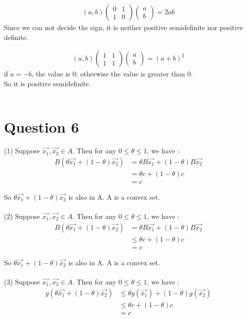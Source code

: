 \documentclass{amsart}
\begin{document}
\begin{align}
		(a,b)\left(
		\begin{matrix}
			0 & 1\\
			1 & 0
		\end{matrix}
		\right)
		\left(
		\begin{matrix}
			a\\
			b
		\end{matrix}
		\right)= 2ab
\end{align}
Since we can not decide the sign, it is neither positive semidefinite nor positive definite.
	
\begin{align}
	(a,b)\left(
	\begin{matrix}
		1 & 1\\
		1 & 1
	\end{matrix}
	\right)
	\left(
	\begin{matrix}
		a\\
		b
	\end{matrix}
	\right)= (a+b)^2
\end{align}	
if $a=-b$, the value is 0; otherwise the value is greater than 0.\\
So it is positive semidefinite.
\\
\\
\section{Question 6}
\noindent(1)
Suppose $\vec{x_1}, \vec{x_2} \in A$. Then for any $0\le \theta \le 1$, we have :
\begin{align*}
	B(\theta\vec{x_1} + (1-\theta)\vec{x_2}) &= \theta B \vec{x_1} + (1-\theta)B\vec{x_2}\\
	&= \theta c + (1-\theta) c\\
	&= c
\end{align*}

So $\theta\vec{x_1} + (1-\theta)\vec{x_2}$ is also in A. 
A is a convex set.
\\\\
\noindent(2)
Suppose $\vec{x_1}, \vec{x_2} \in A$. Then for any $0\le \theta \le 1$, we have :
\begin{align*}
	B(\theta\vec{x_1} + (1-\theta)\vec{x_2}) &= \theta B \vec{x_1} + (1-\theta)B\vec{x_2}\\
	&\le \theta c + (1-\theta) c\\
	&= c
\end{align*}

So $\theta\vec{x_1} + (1-\theta)\vec{x_2}$ is also in A. 
A is a convex set.
\\\\
\noindent(3)
Suppose $\vec{x_1}, \vec{x_2} \in A$. Then for any $0\le \theta \le 1$, we have :
\begin{align*}
	g(\theta\vec{x_1} + (1-\theta)\vec{x_2}) &\le \theta g(\vec{x_1}) + (1-\theta)g(\vec{x_2})\\
	&\le \theta c + (1-\theta) c\\
	&= c
\end{align*}
\end{document}
